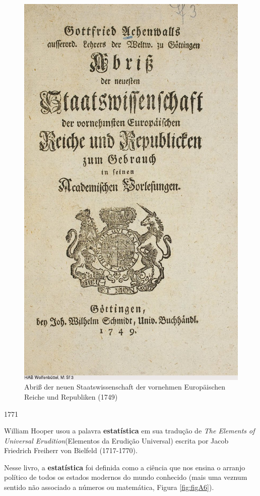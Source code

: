 \documentclass[
]{book}
\begin{document}
\begin{figure}

{\centering \includegraphics[width=0.75\linewidth]{images1/gottfried} 

}

\caption{Abriß der neuen Staatswissenschaft der vornehmen Europäischen Reiche und Republiken (1749)}\label{fig:figA5}
\end{figure}

\hfill\break

1771

\hfill\break

William Hooper usou a palavra \textbf{estatística} em sua tradução de \emph{The Elements of Universal Erudition}(Elementos da Erudição Universal) escrita por Jacob Friedrich Freiherr von Bielfeld (1717-1770).

Nesse livro, a \textbf{estatística} foi definida como a ciência que nos ensina o arranjo político de todos os estados modernos do mundo conhecido (mais uma veznum sentido não associado a números ou matemática, Figura \ref{fig:figA6}).
\end{document}
